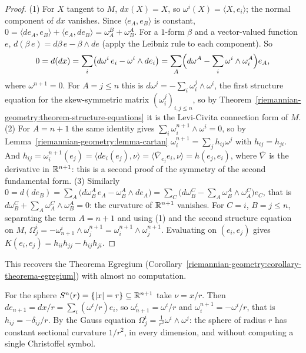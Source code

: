\begin{proof}
(1) For $X$ tangent to $M$, $dx(X) = X$, so $\omega^i(X) = \langle X, e_i\rangle$; the normal component of $dx$ vanishes. Since $\langle e_A, e_B\rangle$ is constant,
$0 = \langle de_A, e_B\rangle + \langle e_A, de_B\rangle = \omega^B_A + \omega^A_B$. For a $1$-form $\beta$ and a vector-valued function $e$, $d(\beta\,e) = d\beta\,e - \beta \wedge de$ (apply the
Leibniz rule to each component). So
\[
0 = d(dx) = \sum_i\bigl(d\omega^i\,e_i - \omega^i \wedge de_i\bigr) = \sum_A\Bigl(d\omega^A - \sum_i\omega^i \wedge \omega^A_i\Bigr)e_A,
\]
where $\omega^{n+1} = 0$. For $A = j \leq n$ this is $d\omega^j = -\sum_i\omega^j_i \wedge \omega^i$, the first structure equation for the skew-symmetric matrix $(\omega^j_i)_{i,j \leq n}$, so by
Theorem~\ref{riemannian-geometry:theorem-structure-equations} it is the Levi-Civita connection form of $M$.
(2) For $A = n + 1$ the same identity gives $\sum_i\omega^{n+1}_i \wedge \omega^i = 0$, so by Lemma~\ref{riemannian-geometry:lemma-cartan} $\omega^{n+1}_i = \sum_jh_{ij}\omega^j$ with
$h_{ij} = h_{ji}$. And $h_{ij} = \omega^{n+1}_i(e_j) = \langle de_i(e_j), \nu\rangle = \langle\overline\nabla_{e_j}e_i, \nu\rangle = h(e_j, e_i)$, where $\overline\nabla$ is the derivative in $\mathbb{R}^{n+1}$: this is a second
proof of the symmetry of the second fundamental form.
(3) Similarly $0 = d(de_B) = \sum_A\bigl(d\omega^A_B\,e_A - \omega^A_B \wedge de_A\bigr) = \sum_C\bigl(d\omega^C_B - \sum_A\omega^A_B \wedge \omega^C_A\bigr)e_C$, that is
$d\omega^C_B + \sum_A\omega^C_A \wedge \omega^A_B = 0$: the curvature of $\mathbb{R}^{n+1}$ vanishes. For $C = i$, $B = j \leq n$, separating the term $A = n + 1$ and using (1) and the second structure
equation on $M$, $\Omega^i_j = -\omega^i_{n+1} \wedge \omega^{n+1}_j = \omega^{n+1}_i \wedge \omega^{n+1}_j$. Evaluating on $(e_i, e_j)$ gives $K(e_i, e_j) = h_{ii}h_{jj} - h_{ij}h_{ji}$.
\end{proof}

This recovers the Theorema Egregium (Corollary~\ref{riemannian-geometry:corollary-theorema-egregium}) with almost no computation.

\begin{example}\label{riemannian-geometry:example-sphere-frames}
For the sphere $S^n(r) = \{|x| = r\} \subseteq \mathbb{R}^{n+1}$ take $\nu = x/r$. Then $de_{n+1} = dx/r = \sum_i(\omega^i/r)e_i$, so $\omega^i_{n+1} = \omega^i/r$ and $\omega^{n+1}_i = -\omega^i/r$, that is
$h_{ij} = -\delta_{ij}/r$. By the Gauss equation $\Omega^i_j = \frac{1}{r^2}\omega^i \wedge \omega^j$: the sphere of radius $r$ has constant sectional curvature $1/r^2$, in every dimension, and
without computing a single Christoffel symbol.
\end{example}

